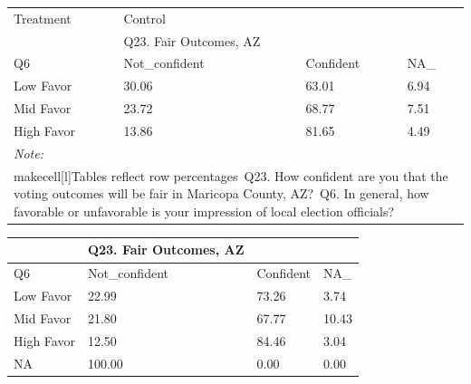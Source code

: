 \documentclass[
  11pt,
  a4paper,
]{article}
\begin{document}
\begin{table}
\centering
\centering
\begin{tabular}[t]{l|l|l|l}
\hline
\multicolumn{1}{l|}{Treatment} & \multicolumn{1}{l}{Control} \\
\cline{1-1} \cline{2-2}
 & Q23. Fair Outcomes, AZ &  & \\
\hline
Q6 & Not\_confident & Confident & NA\_\\
\hline
Low Favor & 30.06 & 63.01 & 6.94\\
\hline
Mid Favor & 23.72 & 68.77 & 7.51\\
\hline
High Favor & 13.86 & 81.65 & 4.49\\
\hline
\multicolumn{4}{l}{\rule{0pt}{1em}\textit{Note: }}\\
\multicolumn{4}{l}{\rule{0pt}{1em}makecell[l]{Tables reflect row percentages\ Q23. How confident are you that the voting outcomes will be fair in Maricopa County, AZ?\ Q6. In general, how favorable or unfavorable is your impression of local election officials?}}\\
\end{tabular}
\centering
\begin{tabular}[t]{l|l|l|l}
\hline
 & Q23. Fair Outcomes, AZ &  & \\
\hline
Q6 & Not\_confident & Confident & NA\_\\
\hline
Low Favor & 22.99 & 73.26 & 3.74\\
\hline
Mid Favor & 21.80 & 67.77 & 10.43\\
\hline
High Favor & 12.50 & 84.46 & 3.04\\
\hline
NA & 100.00 & 0.00 & 0.00\\
\hline
\end{tabular}
\end{table}
\end{document}
